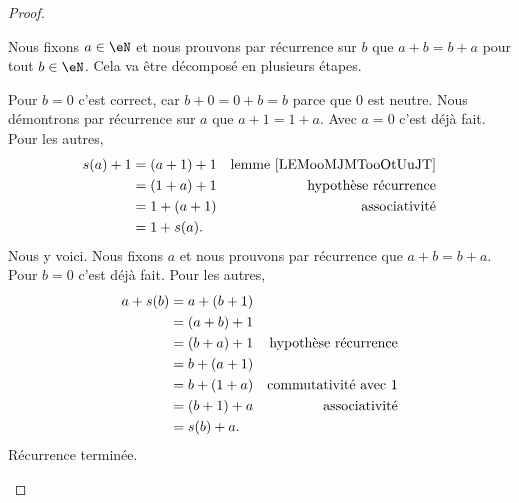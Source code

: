 \begin{proof}
\begin{subproof}
		\spitem[Commutativité]
		Nous fixons \( a\in \eN\) et nous prouvons par récurrence sur \( b\) que \( a+b=b+a\) pour tout \( b\in \eN\). Cela va être décomposé en plusieurs étapes.
  		\begin{subproof}
			\spitem[\( a+0=0+a\)]
				Pour \( b=0\) c'est correct, car \( b+0=0+b=b\) parce que \( 0\) est neutre.
			\spitem[\( a+1=1+a\)]
				Nous démontrons par récurrence sur \( a\) que \( a+1=1+a\). Avec \( a=0\) c'est déjà fait. Pour les autres,
				\begin{subequations}
					\begin{align}
						s(a)+1 & =(a+1)+1 & \text{lemme \ref{LEMooMJMTooOtUuJT}} \\
							& =(1+a)+1 & \text{hypothèse récurrence}          \\
				       		& =1+(a+1) & \text{associativité}                 \\
				       		& =1+s(a).
				\end{align}
			\end{subequations}
			\spitem[\( a+b=b+a\)]
				Nous y voici. Nous fixons \( a\) et nous prouvons par récurrence que \( a+b=b+a\). Pour \( b=0\) c'est déjà fait. Pour les autres,
				\begin{subequations}
					\begin{align}
						a+s(b) & =a+(b+1)                                    \\
				       		& =(a+b)+1                                    \\
				       		& =(b+a)+1 & \text{hypothèse récurrence}      \\
				       		& =b+(a+1)                                    \\
				       		& =b+(1+a) & \text{commutativité avec \( 1\)} \\
				       		& =(b+1)+a & \text{associativité}             \\
				       		& =s(b)+a.
					\end{align}
				\end{subequations}
			Récurrence terminée.
   		\end{subproof}
	 

\end{subproof}
\end{proof}
